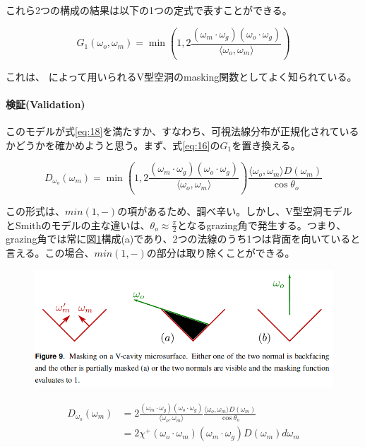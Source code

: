 \documentclass[a4j,xelatex,ja=standard]{bxjsarticle}
\begin{document}
これら2つの構成の結果は以下の1つの定式で表すことができる。

\begin{equation}
    G_1(\omega_o, \omega_m) = \min \left( 1, 2 \frac{(\omega_m \cdot \omega_g) (\omega_o \cdot \omega_g)}{\langle \omega_o, \omega_m \rangle} \right)
    \label{eq:49}
\end{equation}

これは、\citeauthor{Cook1982} \cite{Cook1982}によって用いられるV型空洞のmasking関数としてよく知られている。

\paragraph{検証(Validation)}

このモデルが式\eqref{eq:18}を満たすか、すなわち、可視法線分布が正規化されているかどうかを確かめようと思う。まず、式\eqref{eq:16}の$G_1$を置き換える。

\begin{equation}
    D_{\omega_o}(\omega_m) = \min \left( 1, 2 \frac{(\omega_m \cdot \omega_g) (\omega_o \cdot \omega_g)}{\langle \omega_o, \omega_m \rangle} \right) \frac{\langle \omega_o, \omega_m \rangle D(\omega_m)}{\cos\theta_o}
    \label{eq:50}
\end{equation}

この形式は、$min(1, -)$の項があるため、調べ辛い。しかし、V型空洞モデルとSmithのモデルの主な違いは、$\theta_o \approx \frac{\pi}{2}$となるgrazing角で発生する。つまり、grazing角では常に図\ref{fig:9}構成(a)であり、2つの法線のうち1つは背面を向いていると言える。この場合、$min(1, -)$の部分は取り除くことができる。

\begin{figure}
    \includegraphics[width=\textwidth]{Figure9.png}
    \caption{}
    \label{fig:9}
\end{figure}

\begin{equation}
    \begin{split}
        D_{\omega_o}(\omega_m)
        &= 2 \frac{(\omega_m \cdot \omega_g) (\omega_o \cdot \omega_g)}{\langle \omega_o, \omega_m \rangle} \frac{\langle \omega_o, \omega_m \rangle D(\omega_m)}{\cos\theta_o} \\
        &= 2 \chi^+(\omega_o \cdot \omega_m) (\omega_m \cdot \omega_g) D(\omega_m) d\omega_m
    \end{split}
    \label{eq:51}
\end{equation}
\end{document}

